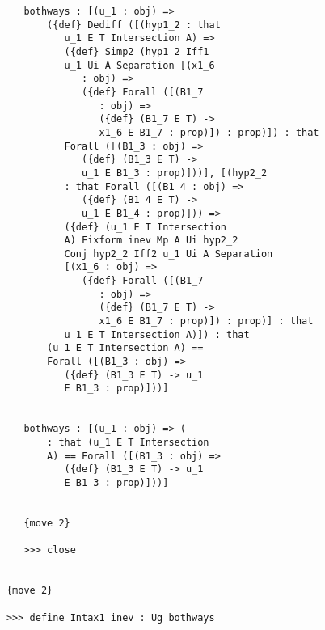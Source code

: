 \documentclass[12pt]{article}
\begin{document}
\begin{verbatim}
         bothways : [(u_1 : obj) => 
             ({def} Dediff ([(hyp1_2 : that 
                u_1 E T Intersection A) => 
                ({def} Simp2 (hyp1_2 Iff1 
                u_1 Ui A Separation [(x1_6 
                   : obj) => 
                   ({def} Forall ([(B1_7 
                      : obj) => 
                      ({def} (B1_7 E T) -> 
                      x1_6 E B1_7 : prop)]) : prop)]) : that 
                Forall ([(B1_3 : obj) => 
                   ({def} (B1_3 E T) -> 
                   u_1 E B1_3 : prop)]))], [(hyp2_2 
                : that Forall ([(B1_4 : obj) => 
                   ({def} (B1_4 E T) -> 
                   u_1 E B1_4 : prop)])) => 
                ({def} (u_1 E T Intersection 
                A) Fixform inev Mp A Ui hyp2_2 
                Conj hyp2_2 Iff2 u_1 Ui A Separation 
                [(x1_6 : obj) => 
                   ({def} Forall ([(B1_7 
                      : obj) => 
                      ({def} (B1_7 E T) -> 
                      x1_6 E B1_7 : prop)]) : prop)] : that 
                u_1 E T Intersection A)]) : that 
             (u_1 E T Intersection A) == 
             Forall ([(B1_3 : obj) => 
                ({def} (B1_3 E T) -> u_1 
                E B1_3 : prop)]))]


         bothways : [(u_1 : obj) => (--- 
             : that (u_1 E T Intersection 
             A) == Forall ([(B1_3 : obj) => 
                ({def} (B1_3 E T) -> u_1 
                E B1_3 : prop)]))]


         {move 2}

         >>> close


      {move 2}

      >>> define Intax1 inev : Ug bothways



\end{verbatim}
\end{document}
